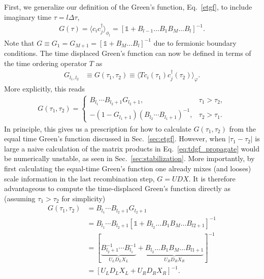 \documentclass[submission, Phys]{SciPost}
\begin{document}
First, we generalize our definition of the Green's function, Eq.~\ref{etgf}, to include imaginary time $\tau = l \Delta \tau$,
\begin{align}
	G(\tau) = \langle c_{i} c_{j}^\dagger \rangle_{\phi_l} = \left[ \mathbb{1} + B_{l-1}\dots B_1 B_M \dots B_l \right]^{-1}. \label{eq:etgf_tau}
\end{align}
Note that $ G \equiv G_1 = G_{M+1} = \left[ \mathbb{1} + B_M \dots B_l \right]^{-1} $ due to fermionic boundary conditions. The time displaced Green's function can now be defined in terms of the time ordering operator $T$ as \cite{Santos2003, Assaad2002a}
\begin{align*}
	G_{l_1,l_2} &\equiv G(\tau_1, \tau_2) \equiv \langle T c_i(\tau_1) c_j^\dagger(\tau_2) \rangle_\varphi.
\end{align*}
More explicitly, this reads
\begin{align}
	G(\tau_1, \tau_2) = \begin{cases}
		B_{l_1} \cdots B_{l_2 + 1} G_{l_2 + 1}, &\tau_1 > \tau_2,\\
		- \left( 1 - G_{l_1 + 1} \right) \left( B_{l_2} \cdots B_{l_1 + 1}\right)^{-1}, &\tau_2 > \tau_1.
	\end{cases} \label{eq:tdgf_propagate}
\end{align}
In principle, this gives us a prescription for how to calculate $G(\tau_1, \tau_2)$ from the equal time Green's function discussed in Sec.~\ref{sec:etgf}. However, when $|\tau_1 - \tau_2|$ is large a naive calculation of the matrix products in Eq.~\ref{eq:tdgf_propagate} would be numerically unstable, as seen in Sec.~\ref{sec:stabilization}. More importantly, by first calculating the equal-time Green's function one already mixes (and looses) scale information in the last recombination step, ${G = UDX}$. It is therefore  advantageous to compute the time-displaced Green's function directly as (assuming $\tau_1>\tau_2$ for simplicity)
\begin{align}
	G(\tau_1, \tau_2) &= B_{l_1} \cdots B_{l_2 + 1} G_{l_2 + 1}\\
	&= B_{l_1} \cdots B_{l_2 + 1} \left[ \mathbb{1} + B_{l_2}\dots B_1 B_M \dots B_{l2+1} \right]^{-1}\\
	&= \left[\underbrace{B_{l_2+1}^{-1} \cdots B_{l_1}^{-1}}_{U_LD_LX_L} + \underbrace{B_{l_2}\dots B_1 B_M \dots B_{l1+1}}_{U_RD_RX_R}\right]^{-1} \\
	&= \left[U_L D_L X_L + U_R D_R X_R\right]^{-1}.
\end{align}
\end{document}

